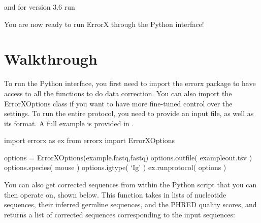 \documentclass[letterpaper,10pt,english]{sphinxmanual}
\begin{document}
\begin{sphinxVerbatim}[commandchars=\\\{\}]
  
\end{sphinxVerbatim}

and for version 3.6 run

\begin{sphinxVerbatim}[commandchars=\\\{\}]
  
\end{sphinxVerbatim}

You are now ready to run ErrorX through the Python interface!


\section{Walkthrough}
\label{\detokenize{index:id2}}
To run the Python interface, you first need to import the errorx package to have access to all the functions to do data correction. You can also import the ErrorXOptions class if you want to have more fine-tuned control over the settings. To run the entire protocol, you need to provide an input file, as well as its format. A full example is provided in .

\begin{sphinxVerbatim}[commandchars=\\\{\}]
import errorx as ex
from errorx import ErrorXOptions

options = ErrorXOptions(\PYGZsq{}example.fastq\PYGZsq{},\PYGZsq{}fastq\PYGZsq{})
options.outfile( \PYGZsq{}example\PYGZus{}out.tsv\PYGZsq{} )
options.species( \PYGZsq{}mouse\PYGZsq{} )
options.igtype( ‘Ig’ )
ex.run\PYGZus{}protocol( options )
\end{sphinxVerbatim}

You can also get corrected sequences from within the Python script that you can then operate on, shown below. This function takes in lists of nucleotide sequences, their inferred germline sequences, and the PHRED quality scores, and returns a list of corrected sequences corresponding to the input sequences:

\begin{sphinxVerbatim}[commandchars=\\\{\}]
  \PYG{p}{[}\PYG{p}{]} 
  \PYG{p}{[}\PYG{p}{]}
  \PYG{p}{[}\PYG{p}{]}

      
\end{sphinxVerbatim}
\end{document}
